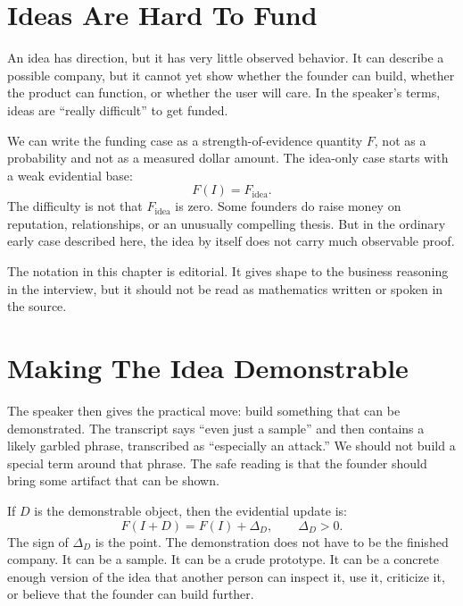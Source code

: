 \section{Ideas Are Hard To Fund}

An idea has direction, but it has very little observed behavior. It can describe a possible company, but it cannot yet show whether the founder can build, whether the product can function, or whether the user will care. In the speaker's terms, ideas are ``really difficult'' to get funded.

We can write the funding case as a strength-of-evidence quantity \(F\), not as a probability and not as a measured dollar amount. The idea-only case starts with a weak evidential base:
\begin{equation}
F(I)=F_{\mathrm{idea}} .
\end{equation}
The difficulty is not that \(F_{\mathrm{idea}}\) is zero. Some founders do raise money on reputation, relationships, or an unusually compelling thesis. But in the ordinary early case described here, the idea by itself does not carry much observable proof.

\begin{remark}
The notation in this chapter is editorial. It gives shape to the business reasoning in the interview, but it should not be read as mathematics written or spoken in the source.
\end{remark}

\section{Making The Idea Demonstrable}

The speaker then gives the practical move: build something that can be demonstrated. The transcript says ``even just a sample'' and then contains a likely garbled phrase, transcribed as ``especially an attack.'' We should not build a special term around that phrase. The safe reading is that the founder should bring some artifact that can be shown.

If \(D\) is the demonstrable object, then the evidential update is:
\begin{equation}
F(I+D)=F(I)+\Delta_D,\qquad \Delta_D>0 .
\end{equation}
The sign of \(\Delta_D\) is the point. The demonstration does not have to be the finished company. It can be a sample. It can be a crude prototype. It can be a concrete enough version of the idea that another person can inspect it, use it, criticize it, or believe that the founder can build further.

